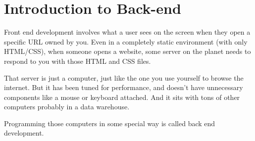  \section{Introduction to Back-end }

\hspace{2cm}Front end development involves what a user sees on the screen when they open a specific URL owned by you. Even in a completely static environment (with only HTML/CSS), when someone opens a website, some server on the planet needs to respond to you with those HTML and CSS files.

That server is just a computer, just like the one you use yourself to browse the internet. But it has been tuned for performance, and doesn't have unnecessary components like a mouse or keyboard attached. And it sits with tons of other computers probably in a data warehouse.

Programming those computers in some special way is called back end development.


 
 